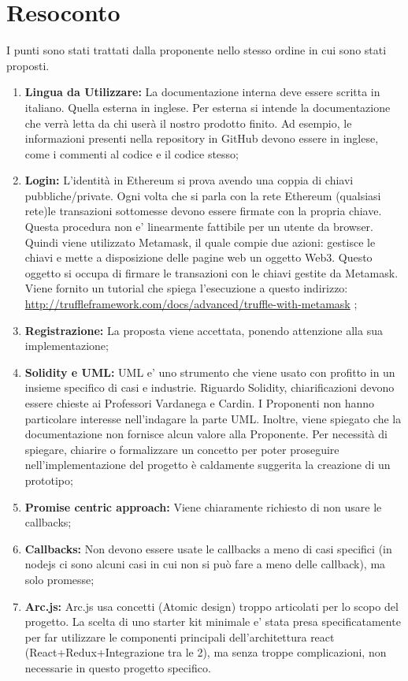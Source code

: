 \documentclass[RaccoltaVerbali.tex]{subfiles}
\begin{document}
\section{Resoconto}
I punti sono stati trattati dalla proponente nello stesso ordine in cui sono stati proposti.
\begin{enumerate}
	\item \textbf{Lingua da Utilizzare:} La documentazione interna deve essere scritta in italiano. Quella esterna in inglese. Per esterna si intende la documentazione che verrà letta da chi userà il nostro prodotto finito. Ad esempio, le informazioni presenti nella repository in GitHub devono essere in inglese, come i commenti al codice e il codice stesso;
	\item \textbf{Login:} L'identità in Ethereum si prova avendo una coppia di chiavi pubbliche/private. Ogni volta che si parla con la rete Ethereum (qualsiasi rete)le transazioni sottomesse devono essere firmate con la propria chiave. Questa procedura non e' linearmente fattibile per un utente da browser. Quindi viene utilizzato Metamask, il quale compie due azioni: gestisce le chiavi e mette a disposizione delle pagine web un oggetto Web3. Questo oggetto si occupa di firmare le transazioni con le chiavi gestite da Metamask. Viene fornito un tutorial che spiega l'esecuzione a questo indirizzo: \href{http://truffleframework.com/docs/advanced/truffle-with-metamask}{http://truffleframework.com/docs/advanced/truffle-with-metamask} ;
	\item \textbf{Registrazione:} La proposta viene accettata, ponendo attenzione alla sua implementazione;
	\item \textbf{Solidity e UML:} UML e' uno strumento che viene usato con profitto in un insieme specifico di casi e industrie. Riguardo Solidity, chiarificazioni devono essere chieste ai Professori Vardanega e Cardin. I Proponenti non hanno particolare interesse nell'indagare la parte UML. Inoltre, viene spiegato che la documentazione non fornisce alcun valore alla Proponente. Per necessità di spiegare, chiarire o formalizzare un concetto per poter proseguire nell'implementazione del progetto è caldamente suggerita la creazione di un prototipo;
	\item \textbf{Promise centric approach:} Viene chiaramente richiesto di non usare le callbacks;
	\item \textbf{Callbacks:} Non devono essere usate le callbacks a meno di casi specifici (in nodejs ci sono alcuni casi in cui non si può fare a meno delle callback), ma solo promesse;
	\item \textbf{Arc.js:} Arc.js usa concetti (Atomic design) troppo articolati per lo scopo del progetto. La scelta di uno starter kit minimale e' stata presa specificatamente per far utilizzare le  componenti principali dell'architettura react (React+Redux+Integrazione tra le 2), ma senza troppe complicazioni, non necessarie in questo progetto specifico.
\end{enumerate}
\end{document}
